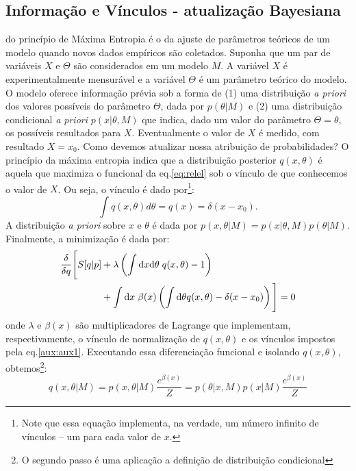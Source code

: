 \subsection{Informação e Vínculos - atualização Bayesiana}
\label{sec:bayes}
 do princípio de Máxima Entropia é o da ajuste de parâmetros teóricos de um modelo quando novos dados empíricos são coletados. Suponha que um par de variáveis $X$ e $\Theta$ são considerados em um modelo $M$. A variável $X$ é experimentalmente mensurável e a variável $\Theta$ é um parâmetro teórico do modelo. O modelo oferece informação prévia sob a forma de (1) uma distribuição \emph{a priori} dos valores possíveis do parâmetro $\Theta$, dada por $p(\theta | M)$ e (2) uma distribuição condicional \emph{a priori}  $p(x | \theta, M)$ que indica, dado um valor do parâmetro $\Theta = \theta$, os possíveis resultados para $X$. Eventualmente o valor de $X$ é medido, com resultado $X = x_0$. Como devemos atualizar nossa atribuição de probabilidades? O princípio da máxima entropia indica que a distribuição posterior $q(x,\theta)$ é aquela que maximiza o funcional da eq.\eqref{eq:relel} sob o vínculo de que conhecemos o valor de $X$. Ou seja, o vínculo é dado por\footnote{Note que essa equação implementa, na verdade, um número infinito de vínculos -- um para cada valor de $x$.}:
\begin{equation}
\label{aux:aux1}
 \int q(x, \theta) d\theta = q(x) = \delta(x-x_0).
\end{equation}
 A distribuição \emph{a priori} sobre $x$ e $\theta$ é dada por $p(x, \theta| M) = p(x|\theta, M) p(\theta| M)$. Finalmente, a minimização é dada por:
\begin{align}
 \frac{\delta}{\delta q} \Bigg[ S[q | p] &+ \lambda \left(\int \mathrm{d} x\mathrm{d}\theta\; q(x,\theta) -1 \right) \nonumber\\
  &+ \int \mathrm{d} x\; \beta(x) \left(\int\mathrm{d}\theta q(x,\theta) - \delta(x-x_0)\right)\Bigg] =0 \nonumber
\end{align}
onde $\lambda$ e $\beta(x)$ são multiplicadores de Lagrange que implementam, respectivamente, o vínculo de normalização de $q(x,\theta)$ e os vínculos impostos pela eq.\eqref{aux:aux1}. Executando essa diferenciação funcional e isolando $q(x,\theta)$, obtemos\footnote{O segundo passo é uma aplicação a definição de distribuição condicional}:
\begin{equation}
 q(x,\theta| M) = p(x,\theta| M)\frac{e^{\beta(x)}}{Z} = p(\theta|x, M)p(x |M)\frac{e^{\beta(x)}}{Z}
\end{equation}
